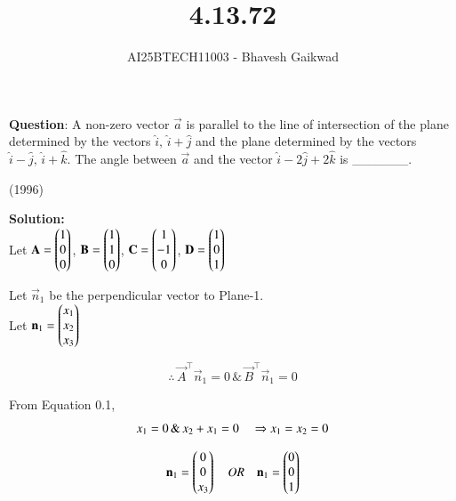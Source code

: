 \documentclass[journal]{IEEEtran}
\begin{document}

\vspace{3cm}

\title{4.13.72}
\author{AI25BTECH11003 - Bhavesh Gaikwad}
{\let\newpage\relax\maketitle}

\renewcommand{\thefigure}{\theenumi}
\renewcommand{\thetable}{\theenumi}
\setlength{\intextsep}{10pt} 


\renewcommand{\thetable}{\theenumi}


\textbf{Question}: 
A non-zero vector $\vec{a}$ is parallel to the line of intersection of the plane determined by the vectors $\hat{i}, \, \hat{i} + \hat{j}$ and the plane determined by the vectors $\hat{i} - \hat{j}, \, \hat{i} + \hat{k}$. The angle between $\vec{a}$ and the vector $\hat{i} - 2\hat{j} + 2\hat{k}$ is \_\_\_\_\_\_.

\hfill{(1996)}

\textbf{Solution:}\\

Let $\mathbf{A} =\begin{pmatrix}1 \\ 0 \\ 0\end{pmatrix}$, $\mathbf{B} =\begin{pmatrix} 1 \\ 1 \\ 0\end{pmatrix}$, $\mathbf{C} =\begin{pmatrix}1 \\ -1 \\ 0\end{pmatrix}$, $\mathbf{D} =\begin{pmatrix}1 \\ 0 \\ 1\end{pmatrix}$


Let $\vec{n}_1$ be the perpendicular vector to Plane-1.\\
Let $\mathbf{n}_1 = \begin{pmatrix}x_1 \\ x_2 \\ x_3\end{pmatrix}$

\begin{equation}
\therefore \, \vec{A}^\top\vec{n}_1=0 \, \& \, \vec{B}^\top\vec{n}_1=0
\end{equation}

From Equation 0.1,
\begin{equation}
x_1 = 0 \, \& \, x_2 + x_1 = 0 \\
\quad \Rightarrow x_1 = x_2 = 0
\end{equation}

\begin{equation}
    \mathbf{n}_1 = \begin{pmatrix}0 \\ 0 \\ x_3\end{pmatrix} \quad OR \quad \mathbf{n}_1 = \begin{pmatrix}0 \\ 0 \\ 1\end{pmatrix}
\end{equation}
\end{document}
